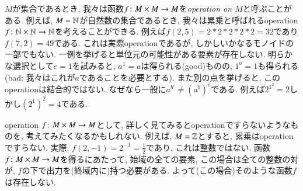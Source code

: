 \begin{example}[非モノイド]


$M$が集合であるとき, 我々は函数$f\colon M\times M\rightarrow M$を\emph{operation on $M$}と呼ぶことがある. 例えば, $M={\mathbb N}$が自然数の集合であるとき, 我々は累乗と呼ばれるoperation $f\colon{\mathbb N}\times{\mathbb N}\rightarrow{\mathbb N}$を考えることができる. 例えば$f(2,5)=2*2*2*2*2=32$であり$f(7,2)=49$である. これは実際operationであるが, しかしいかなるモノイドの一部でもない. 一例を挙げると単位元の可能性がある要素が存在しない. 明らかな選択として$e=1$を試みると, $a^1=a$は得られる(good)ものの, $1^a=1$も得られる(bad: 我々はこれが$a$であることを必要とする). また別の点を挙げると, このoperationは結合的ではない. なぜなら一般に$a^{b^c}\neq (a^b)^c$である. 例えば$2^{1^2}=2$しかし$(2^1)^2=4$である.


operation $f\colon M\times M\rightarrow M$として, 詳しく見てみるとoperationですらないようなものを, 考えてみたくなるかもしれない. 例えば, $M={\mathbb Z}$とすると, 累乗はoperationですらない. 実際, $f(2,-1)=2^{-1}=\frac{1}{2}$であり, これは整数ではない. 函数$f\colon M\times M\rightarrow M$を得るにあたって, 始域の全ての要素, この場合は全ての整数の対が, $f$の下で出力を(終域内に)持つ必要がある. よって(この場合)そのような函数$f$は存在しない. 

\end{example}

